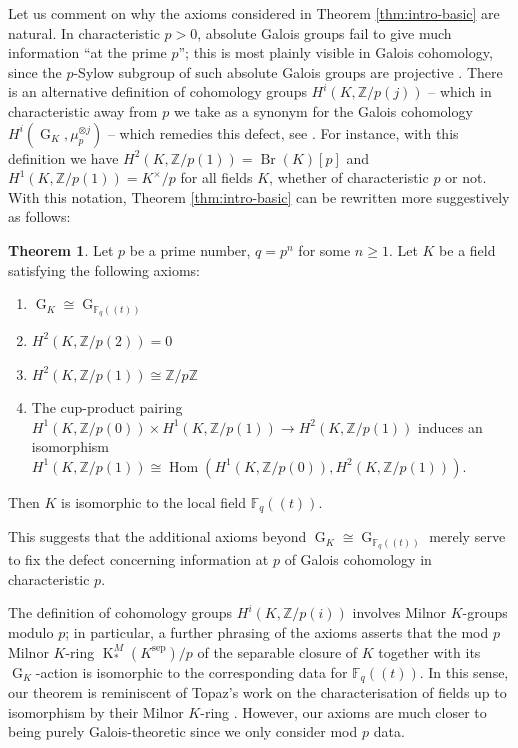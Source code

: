 \documentclass[a4paper, british, oneside]{amsart}
\newcommand{\Z}{\mathbb{Z}}
\newcommand{\F}{\mathbb{F}}
\DeclareMathOperator{\G}{G}
\DeclareMathOperator{\Br}{Br}
\DeclareMathOperator{\Hom}{Hom}
\newcommand{\pow}[1]{(\!(#1)\!)}
\newcommand{\KM}{\operatorname{K}^M}
\theoremstyle{definition}
\newtheorem{theorem}{Theorem}[section]
\theoremstyle{remark}
\begin{document}
Let us comment on why the axioms considered in Theorem \ref{thm:intro-basic} are natural.
In characteristic $p > 0$, absolute Galois groups fail to give much information ``at the prime $p$''; this is most plainly visible in Galois cohomology, since the $p$-Sylow subgroup of such absolute Galois groups are projective \cite[Corollary 6.1.3]{NSW}.
There is an alternative definition of cohomology groups $H^i(K, \Z/p(j))$ -- which in characteristic away from $p$ we take as a synonym for the Galois cohomology $H^i(\G_K, \mu_p^{\otimes j})$ -- which remedies this defect, see \cite[p.~143]{Kato_HassePrinciple}.
For instance, with this definition we have $H^2(K, \Z/p(1)) = \Br(K)[p]$ and $H^1(K, \Z/p(1)) = K^\times/p$ for all fields $K$, whether of characteristic $p$ or not.
With this notation, Theorem \ref{thm:intro-basic} can be rewritten more suggestively as follows:
\begin{theorem}\label{thm:intro-katoesque}
  Let $p$ be a prime number, $q = p^n$ for some $n \geq 1$.
  Let $K$ be a field satisfying the following axioms:
  \begin{enumerate}
  \item[(Gal)] $\G_K \cong \G_{\F_q\pow{t}}$
  \item[(Imp')] $H^2(K, \Z/p(2)) = 0$
  \item[(Brau')] $H^2(K, \Z/p(1)) \cong \Z/p\Z$
  \item[(Pair')] The cup-product pairing $H^1(K, \Z/p(0)) \times H^1(K, \Z/p(1)) \to H^2(K, \Z/p(1))$ induces an isomorphism $H^1(K, \Z/p(1)) \cong \Hom(H^1(K, \Z/p(0)), H^2(K, \Z/p(1)))$.
  \end{enumerate}
  Then $K$ is isomorphic to the local field $\F_q\pow{t}$.
\end{theorem}
This suggests that the additional axioms beyond $\G_K \cong \G_{\F_q\pow{t}}$ merely serve to fix the defect concerning information at $p$ of Galois cohomology in characteristic $p$.

The definition of cohomology groups $H^i(K, \Z/p(i))$ involves Milnor $K$-groups modulo $p$;
in particular, a further phrasing of the axioms asserts that the mod $p$ Milnor $K$-ring $\KM_{\ast}(K^{\mathrm{sep}})/p$ of the separable closure of $K$ together with its $\G_K$-action is isomorphic to the corresponding data for $\F_q\pow{t}$.
In this sense, our theorem is reminiscent of Topaz's work on the characterisation of fields up to isomorphism by their Milnor $K$-ring \cite{Topaz_algDependenceMilnorKTheory}.
However, our axioms are much closer to being purely Galois-theoretic since we only consider mod $p$ data.
\end{document}
